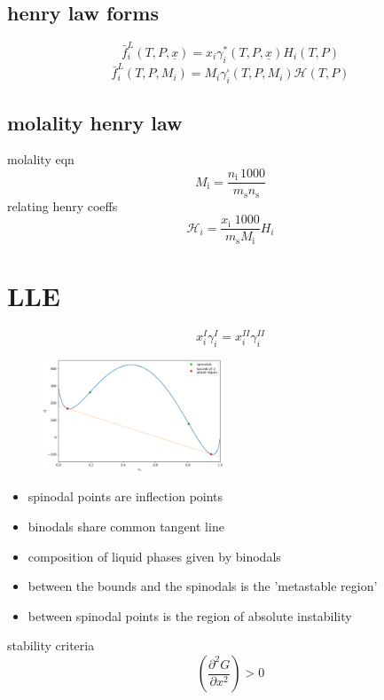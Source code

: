 \documentclass{article}
\begin{document}
\subsection*{henry law forms}
\[\bar{f}_{i}^{L} (T,P,\underline{x}) = x_{i} \gamma_{i}^{*}(T,P,\underline{x}) H_{i}(T,P) \tag{molarity} \]
\[ \bar{f}_{i}^{L}(T,P,M_{i}) = M_{i} \gamma_{i}^{\square}(T,P,M_{i})  \mathcal{H} (T,P) \tag{molality} \]
\subsection*{molality henry law}
molality eqn
\[M_{\mathrm{i}}={\frac{n_{\mathrm{i}} \,1000}{m_{\mathrm{s}}n_{\mathrm{s}}}}\]
relating henry coeffs
\[\mathcal{H}_i = \frac{x_{\mathrm{i}}\;1000}{m_{\mathrm{s}}M_{\mathrm{i}}} H_i\]





\twocolumn

\section*{LLE}
\[x_{i}^{I} \gamma_{i}^{I} = x_{i}^{II} \gamma_{i}^{II} \tag{important LLE eqn}\]

\begin{figure}[ht] %
    \centering
    \includegraphics[width=0.48\textwidth, frame]{lle_gibbs.png}
\end{figure}

\begin{itemize}
    \item spinodal points are inflection points
    \item binodals share common tangent line
    \item composition of liquid phases given by binodals
    \item between the bounds and the spinodals is the 'metastable region'
    \item between spinodal points is the region of absolute instability
\end{itemize}
stability criteria
\[ \left(\frac{ \partial^{2} G }{ \partial x^{2} } \right) > 0  \]
\end{document}
